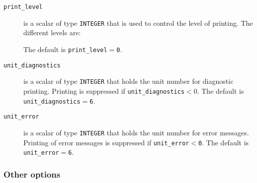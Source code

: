 \begin{description}

\item[\texttt{print\_level}] is a scalar of type  {\tt INTEGER}
that is used to control the level of printing. The different levels are:
The default is {\tt print\_level$=$\tt 0}.

\item[\texttt{unit\_diagnostics}] is a scalar  of type
{\tt INTEGER} that holds the
unit number for diagnostic printing. Printing is suppressed if
{\tt unit\_diagnostics$<0$}.
The default is {\tt unit\_diagnostics$=$6}.

\item[\texttt{unit\_error}] is a scalar of type  {\tt INTEGER} that holds the
unit number for error messages.
Printing of error messages
is suppressed if {\tt unit\_error$<$0}.
The default is {\tt unit\_error$=$6}.

\end{description}



\subsubsection*{Other options}

